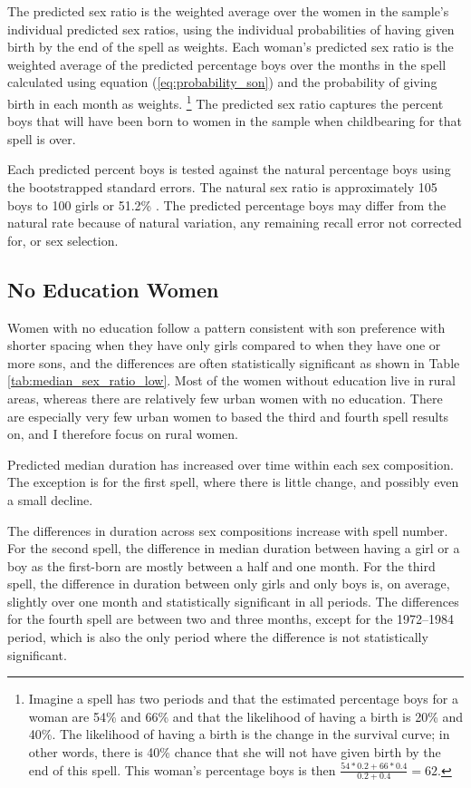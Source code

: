 \documentclass[12pt,letterpaper]{article}
\begin{document}
The predicted sex ratio is the weighted average over the women in the sample's 
individual predicted sex ratios, using the individual probabilities of having
given birth by the end of the spell as weights.
Each woman's predicted sex ratio is the weighted average of the predicted
percentage boys over the months in the spell calculated using equation 
(\ref{eq:probability_son}) and the probability of giving birth in each month 
as weights.%
\footnote{
Imagine a spell has two periods and that the estimated percentage boys for a
woman are 54\% and 66\% and that the likelihood of having a birth is 20\% and 40\%.
The likelihood of having a birth is the change in the survival curve; 
in other words, there is 40\% chance that she will not have given birth by the end of 
this spell.
This woman's percentage boys is then $\frac{54*0.2+66*0.4}{0.2+0.4} = 62$.
}
The predicted sex ratio captures the percent boys that will have been born to women 
in the sample when childbearing for that spell is over.

Each predicted percent boys is tested against the natural percentage 
boys using the bootstrapped standard errors.
The natural sex ratio is approximately 105 boys to 100 girls or
51.2\% \citep{ben-porath76b,jacobsen99,Portner2015b}.
The predicted percentage boys may differ from the natural rate because of 
natural variation, any remaining recall error not corrected for, or 
sex selection. 

\subsection{No Education Women}



Women with no education follow a pattern consistent with son
preference with shorter spacing when they have only girls compared 
to when they have one or more sons, and the differences are often 
statistically significant as shown in Table \ref{tab:median_sex_ratio_low}.
Most of the women without education live in rural areas,
whereas there are relatively few urban women with no education.
There are especially very few urban women to based the third
and fourth spell results on, and I therefore focus on rural women.

Predicted median duration has increased over time within
each sex composition.
The exception is for the first spell, where there is little
change, and possibly even a small decline.

The differences in duration across sex compositions increase with 
spell number.
For the second spell, the difference in median duration between
having a girl or a boy as the first-born are mostly between a half
and one month.
For the third spell, the difference in duration between only girls 
and only boys is, on average, slightly over one month and statistically 
significant in all periods.
The differences for the fourth spell are between two and three months, 
except for the 1972--1984 period, which is also the only period where 
the difference is not statistically significant.
\end{document}

